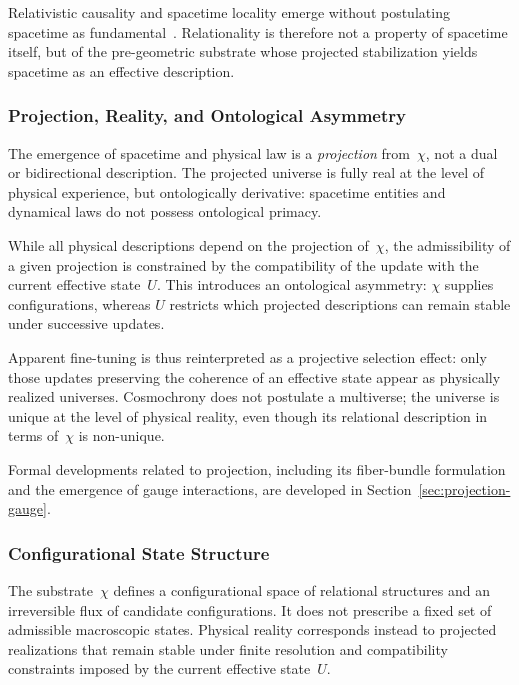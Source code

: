    Relativistic causality and spacetime locality emerge without postulating
    spacetime as fundamental~\cite{Rovelli2018}.
    Relationality is therefore not a property of spacetime itself, but of the
    pre-geometric substrate whose projected stabilization yields spacetime as
    an effective description.

  \subsubsection*{Projection, Reality, and Ontological Asymmetry}
    \label{subsubsec:projection-reality-and-ontological-asymmetry}

    The emergence of spacetime and physical law is a \emph{projection} from~$\chi$,
    not a dual or bidirectional description.
    The projected universe is fully real at the level of physical experience,
    but ontologically derivative: spacetime entities and dynamical laws do not
    possess ontological primacy.

    While all physical descriptions depend on the projection of~$\chi$, the
    admissibility of a given projection is constrained by the compatibility of
    the update with the current effective state~$U$.
    This introduces an ontological asymmetry: $\chi$ supplies configurations,
    whereas $U$ restricts which projected descriptions can remain stable under
    successive updates.

    Apparent fine-tuning is thus reinterpreted as a projective selection effect:
    only those updates preserving the coherence of an effective state appear as
    physically realized universes.
    Cosmochrony does not postulate a multiverse; the universe is unique at the
    level of physical reality, even though its relational description in terms
    of~$\chi$ is non-unique.

    Formal developments related to projection, including its fiber-bundle
    formulation and the emergence of gauge interactions, are developed in
    Section~\ref{sec:projection-gauge}.

  \subsubsection*{Configurational State Structure}
    \label{subsubsec:chi_state_structure}

    The substrate~$\chi$ defines a configurational space of relational
    structures and an irreversible flux of candidate configurations.
    It does not prescribe a fixed set of admissible macroscopic states.
    Physical reality corresponds instead to projected realizations that remain
    stable under finite resolution and compatibility constraints imposed by the
    current effective state~$U$.

